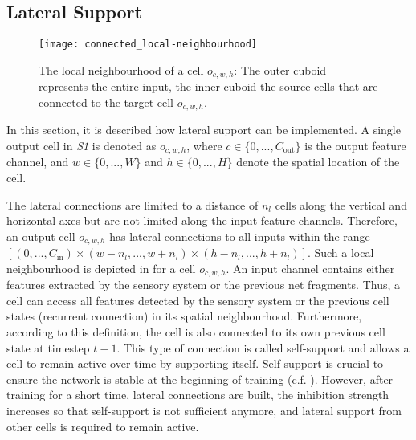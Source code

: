 \subsection{Lateral Support}
\begin{figure}[h]
    \centering
    \texttt{[image: connected\_local-neighbourhood]}
    \caption[The local neighbourhood of a cell $o_{c,w,h}$]{The local neighbourhood of a cell $o_{c,w,h}$: The outer cuboid represents the entire input, the inner cuboid the source cells that are connected to the target cell $o_{c,w,h}$.}
\end{figure}
%
In this section, it is described how lateral support can be implemented.
A single output cell in \emph{S1} is denoted as $o_{c,w,h}$, where $c \in \{0, ..., C_{\text{out}}\}$ is the output feature channel, and $w \in \{0, ..., W\}$ and $h \in \{0, ..., H\}$ denote the spatial location of the cell.

The lateral connections are limited to a distance of $n_{l}$ cells along the vertical and horizontal axes but are not limited along the input feature channels.
Therefore, an output cell $o_{c,w,h}$ has lateral connections to all inputs within the range $\left[(0, ..., C_{\text{in}}) \times (w - n_l, ..., w+n_l) \times (h - n_l, ..., h+n_l)\right]$.
Such a local neighbourhood is depicted in  for a cell $o_{c,w,h}$.
An input channel contains either features extracted by the sensory system or the previous net fragments. Thus, a cell can access all features detected by the sensory system or the previous cell states (recurrent connection) in its spatial neighbourhood.
Furthermore, according to this definition, the cell is also connected to its own previous cell state at timestep $t-1$.
This type of connection is called self-support and allows a cell to remain active over time by supporting itself.
Self-support is crucial to ensure the network is stable at the beginning of training (c.f. ). However, after training for a short time, lateral connections are built, the inhibition strength increases so that self-support is not sufficient anymore, and lateral support from other cells is required to remain active.

